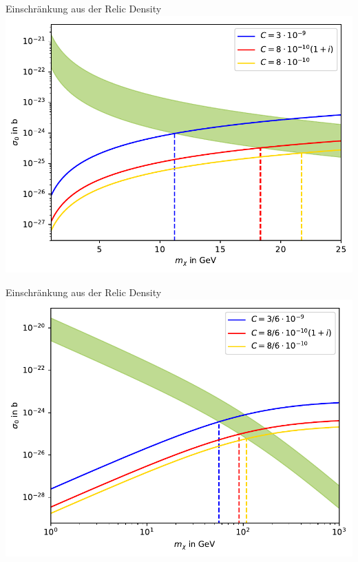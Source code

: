 \begin{frame}{Einschränkung aus der Relic Density}
\includegraphics[width=\textwidth]{Bilder/Relic11.pdf}
\end{frame}
\begin{frame}[noframenumbering]{Einschränkung aus der Relic Density}
\includegraphics[width=\textwidth]{Bilder/Relic116.pdf}
\end{frame}